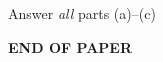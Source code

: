 \documentclass[a4paper,12pt,twoside]{article}
\begin{document}
\item 
  Answer \emph{all} parts (a)--(c)
  



\item 

\begin{center}   \bf END OF PAPER  \end{center}  \vfill
\thispagestyle{end}
\questionsend
\end{document}
